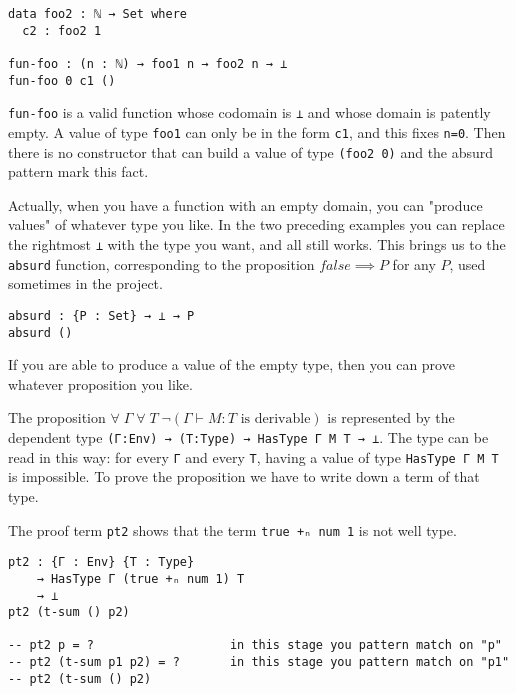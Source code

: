 \documentclass{article}
\begin{document}
\begin{tcolorbox}[breakable, enhanced, parbox=false]
\begin{verbatim}
data foo2 : ℕ → Set where
  c2 : foo2 1

fun-foo : (n : ℕ) → foo1 n → foo2 n → ⊥
fun-foo 0 c1 ()
\end{verbatim}

\texttt{fun-foo} is a valid function whose codomain is \texttt{⊥} and whose domain is patently empty.
A value of type \texttt{foo1} can only be in the form \texttt{c1}, and this fixes \texttt{n=0}.
Then there is no constructor that can build a value of type \texttt{(foo2 0)} and the absurd pattern mark this fact.

Actually, when you have a function with an empty domain, you can "produce values" of whatever type you like.
In the two preceding examples you can replace the rightmost \texttt{⊥} with the type you want, and all still works.
This brings us to the \texttt{absurd} function, corresponding to the proposition $false \implies P$ for any $P$, used sometimes in the project.

\begin{verbatim}
absurd : {P : Set} → ⊥ → P
absurd ()
\end{verbatim}

If you are able to produce a value of the empty type, then you can prove whatever proposition you like.

\end{tcolorbox}


The proposition $\forall \; \Gamma \; \forall \; T \; \neg (\Gamma \vdash M : T \text{ is derivable})$ is represented by the dependent type \texttt{(Γ:Env) → (T:Type) → HasType Γ M T → ⊥}.
The type can be read in this way: for every \texttt{Γ} and every \texttt{T}, having a value of type \texttt{HasType Γ M T} is impossible.
To prove the proposition we have to write down a term of that type.

The proof term \texttt{pt2} shows that the term \texttt{true +ₙ num 1} is not well type.

\begin{verbatim}
pt2 : {Γ : Env} {T : Type}
    → HasType Γ (true +ₙ num 1) T
    → ⊥
pt2 (t-sum () p2)

-- pt2 p = ?                   in this stage you pattern match on "p"
-- pt2 (t-sum p1 p2) = ?       in this stage you pattern match on "p1"
-- pt2 (t-sum () p2)
\end{verbatim}
\end{document}
